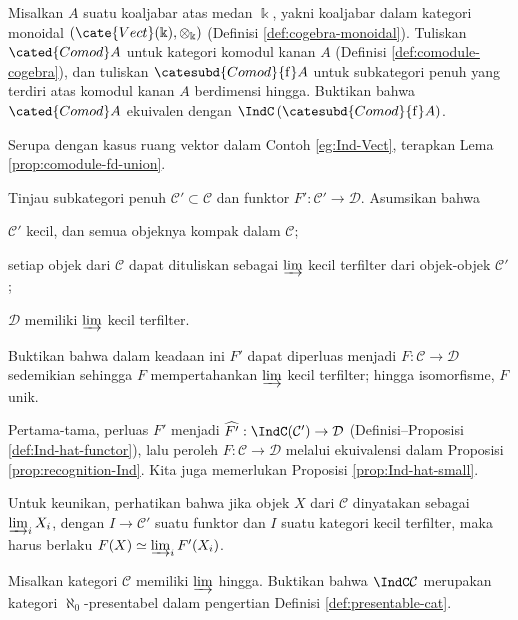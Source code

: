 \begin{Exercises}
	\item Misalkan $A$ suatu koaljabar atas medan $\Bbbk$, yakni koaljabar dalam kategori monoidal $\left( \cate{Vect}(\Bbbk), \otimes_{\Bbbk}\right)$ (Definisi \ref{def:cogebra-monoidal}). Tuliskan $\cated{Comod}A$ untuk kategori komodul kanan $A$ (Definisi \ref{def:comodule-cogebra}), dan tuliskan $\catesubd{Comod}{\mathrm{f}}A$ untuk subkategori penuh yang terdiri atas komodul kanan $A$ berdimensi hingga. Buktikan bahwa $\cated{Comod}A$ ekuivalen dengan $\IndC \left(\catesubd{Comod}{\mathrm{f}}A\right)$.
	
	\begin{hint}
		Serupa dengan kasus ruang vektor dalam Contoh \ref{eg:Ind-Vect}, terapkan Lema \ref{prop:comodule-fd-union}.
	\end{hint}
	
		\item Tinjau subkategori penuh $\mathcal{C}' \subset \mathcal{C}$ dan funktor $F': \mathcal{C}' \to \mathcal{D}$. Asumsikan bahwa
	\begin{compactitem}
		\item $\mathcal{C}'$ kecil, dan semua objeknya kompak dalam $\mathcal{C}$;
		\item setiap objek dari $\mathcal{C}$ dapat dituliskan sebagai $\varinjlim$ kecil terfilter dari objek-objek $\mathcal{C}'$;
		\item $\mathcal{D}$ memiliki $\varinjlim$ kecil terfilter.
	\end{compactitem}
	Buktikan bahwa dalam keadaan ini $F'$ dapat diperluas menjadi $F: \mathcal{C} \to \mathcal{D}$ sedemikian sehingga $F$ mempertahankan $\varinjlim$ kecil terfilter; hingga isomorfisme, $F$ unik.
	
	\begin{hint}
		Pertama-tama, perluas $F'$ menjadi $\widehat{F'}: \IndC(\mathcal{C}') \to \mathcal{D}$ (Definisi--Proposisi \ref{def:Ind-hat-functor}), lalu peroleh $F: \mathcal{C} \to \mathcal{D}$ melalui ekuivalensi dalam Proposisi \ref{prop:recognition-Ind}. Kita juga memerlukan Proposisi \ref{prop:Ind-hat-small}.
		
		Untuk keunikan, perhatikan bahwa jika objek $X$ dari $\mathcal{C}$ dinyatakan sebagai $\varinjlim_i X_i$, dengan $I \to \mathcal{C}'$ suatu funktor dan $I$ suatu kategori kecil terfilter, maka harus berlaku $F(X) \simeq \varinjlim_i F'(X_i)$.
	\end{hint}
	
	\item Misalkan kategori $\mathcal{C}$ memiliki $\varinjlim$ hingga. Buktikan bahwa $\IndC\mathcal{C}$ merupakan kategori $\aleph_0$-presentabel dalam pengertian Definisi \ref{def:presentable-cat}.
	

\end{Exercises}
